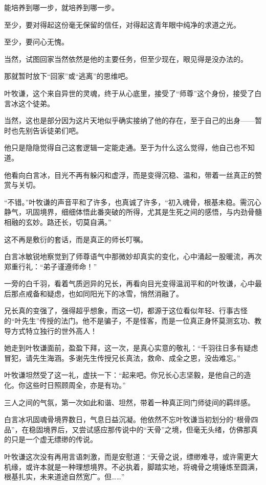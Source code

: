 能培养到哪一步，就培养到哪一步。

至少，要对得起这份毫无保留的信任，对得起这青年眼中纯净的求道之光。

至少，要问心无愧。

当然，试图回家当然依然是他的主要任务，但至少现在，眼见得是没办法的。

那就暂时放下“回家”或“逃离”的思维吧。

叶牧谦，这个来自异世的灵魂，终于从心底里，接受了“师尊”这个身份，接受了白言冰这个徒弟。

当然，这也是部分因为这片天地似乎确实接纳了他的存在，至于自己的出身——暂时也先别告诉徒弟们吧。

他只是隐隐觉得自己这套逻辑一定能走通。至于为什么这么觉得，他自己也不知道。

他看向白言冰，目光不再有躲闪和虚浮，而是变得沉稳、温和，带着一丝真正的赞赏与关切。

“不错。”叶牧谦的声音平和了许多，也真诚了许多，“初入魂骨，根基未稳。需沉心静气，巩固境界，细细体悟此番突破的所得，尤其是生死之间的感悟，与内劲骨髓相融的玄妙。路还长，切莫自满。”

这不再是敷衍的套话，而是真正的师长叮嘱。

白言冰敏锐地察觉到了师尊语气中那微妙却真实的变化，心中涌起一股暖流，再次郑重行礼：“弟子谨遵师命！”

一旁的白千羽，看着气质迥异的兄长，再看向目光变得温润平和的叶牧谦，心中最后那点戒备和疑虑，也如同阳光下的冰雪，悄然消融了。

兄长真的变强了，强得超乎想象，而这一切，都源于这位看似年轻、行事古怪的“叶先生”传授的法门。他不是骗子，不是怪客，而是一位真正身怀莫测玄功、教导方式特立独行的世外高人！

她走到叶牧谦面前，盈盈下拜，这一次，是真心实意的敬礼：“千羽往日多有疑虑冒犯，请先生海涵。多谢先生传授兄长真法，救命、成全之恩，没齿难忘。”

叶牧谦坦然受了这一礼，虚扶一下：“起来吧。你兄长心志坚毅，是他自己的造化。你这些时日照顾周全，亦是有功。”

三人之间的气氛，第一次如此和谐、坦然，带着一种真正同门师徒间的羁绊感。

白言冰巩固魂骨境界数日，气息日益沉凝。他依然不忘叶牧谦当初划分的“根骨四品”，在稳固境界后，又尝试感应那传说中的“天骨”之境，但毫无头绪，仿佛那真的只是一个虚无缥缈的传说。

叶牧谦这次没有再用言语刺激，而是安慰道：“天骨之说，缥缈难寻，或许需更大机缘，或许本就是一种理想境界。不必执着，脚踏实地，将魂骨之境锤炼至圆满，根基扎实，未来道途自然宽广。但……”

